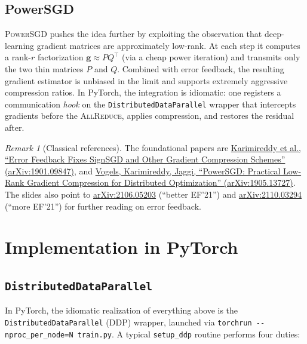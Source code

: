 \documentclass[11pt,a4paper]{article}
\theoremstyle{definition}
\theoremstyle{remark}
\newtheorem*{remark}{Remark}
\theoremstyle{plain}
\newcommand{\allreduce}{\textsc{AllReduce}}
\begin{document}
\subsection{PowerSGD}

\textsc{PowerSGD} pushes the idea further by exploiting the observation
that deep-learning gradient matrices are approximately low-rank. At each
step it computes a rank-$r$ factorization $\mathbf{g} \approx P Q^{\top}$
(via a cheap power iteration) and transmits only the two thin matrices
$P$ and $Q$. Combined with error feedback, the resulting gradient
estimator is unbiased in the limit and supports extremely aggressive
compression ratios. In PyTorch, the integration is idiomatic: one
registers a communication \emph{hook} on the
\texttt{DistributedDataParallel} wrapper that intercepts gradients before
the \allreduce, applies compression, and restores the residual after.

\begin{remark}[Classical references]
The foundational papers are
\href{https://arxiv.org/abs/1901.09847}{Karimireddy et al., ``Error
Feedback Fixes SignSGD and Other Gradient Compression Schemes''
(arXiv:1901.09847)}, and
\href{https://arxiv.org/abs/1905.13727}{Vogels, Karimireddy, Jaggi,
``PowerSGD: Practical Low-Rank Gradient Compression for Distributed
Optimization'' (arXiv:1905.13727)}. The slides also point to
\href{https://arxiv.org/abs/2106.05203}{arXiv:2106.05203} (``better
EF'21'') and \href{https://arxiv.org/abs/2110.03294}{arXiv:2110.03294}
(``more EF'21'') for further reading on error feedback.
\end{remark}

\section{Implementation in PyTorch}

\subsection{\texttt{DistributedDataParallel}}

In PyTorch, the idiomatic realization of everything above is the
\texttt{DistributedDataParallel} (DDP) wrapper, launched via
\verb|torchrun --nproc_per_node=N train.py|. A typical
\texttt{setup\_ddp} routine performs four duties:
\end{document}
